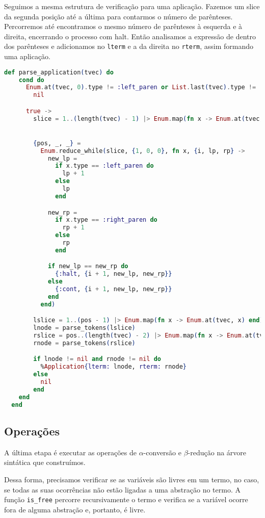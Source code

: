 \documentclass[12pt]{article}
\begin{document}
Seguimos a mesma estrutura de verificação para uma aplicação. Fazemos um slice da segunda posição até a última para contarmos o número de parênteses. Percorremos até encontramos o mesmo número de parênteses à esquerda e à direita, encerrando o processo com halt. Então analisamos a expressão de dentro dos parênteses e adicionamos no \texttt{lterm} e a da direita no \texttt{rterm}, assim formando uma aplicação.
\begin{lstlisting}[language=elixir, caption=Função \texttt{parse application}] 
  def parse_application(tvec) do
    cond do
      Enum.at(tvec, 0).type != :left_paren or List.last(tvec).type != :right_paren ->
        nil

      true ->
        slice = 1..(length(tvec) - 1) |> Enum.map(fn x -> Enum.at(tvec, x) end)


        {pos, _, _} =
          Enum.reduce_while(slice, {1, 0, 0}, fn x, {i, lp, rp} ->
            new_lp =
              if x.type == :left_paren do
                lp + 1
              else
                lp
              end

            new_rp =
              if x.type == :right_paren do
                rp + 1
              else
                rp
              end

            if new_lp == new_rp do
              {:halt, {i + 1, new_lp, new_rp}}
            else
              {:cont, {i + 1, new_lp, new_rp}}
            end
          end)

        lslice = 1..(pos - 1) |> Enum.map(fn x -> Enum.at(tvec, x) end)
        lnode = parse_tokens(lslice)
        rslice = pos..(length(tvec) - 2) |> Enum.map(fn x -> Enum.at(tvec, x) end)
        rnode = parse_tokens(rslice)

        if lnode != nil and rnode != nil do
          %Application{lterm: lnode, rterm: rnode}
        else
          nil
        end
    end
  end
\end{lstlisting}

\subsection{Operações}

A última etapa é executar as operações de $\alpha$-conversão e $\beta$-redução na árvore sintática que construímos.

Dessa forma, precisamos verificar se as variáveis são livres em um termo, no caso, se todas as suas ocorrências não estão ligadas a uma abstração no termo. A função \texttt{is\_free} percorre recursivamente o termo e verifica se a variável ocorre fora de alguma abstração e, portanto, é livre.
\end{document}
